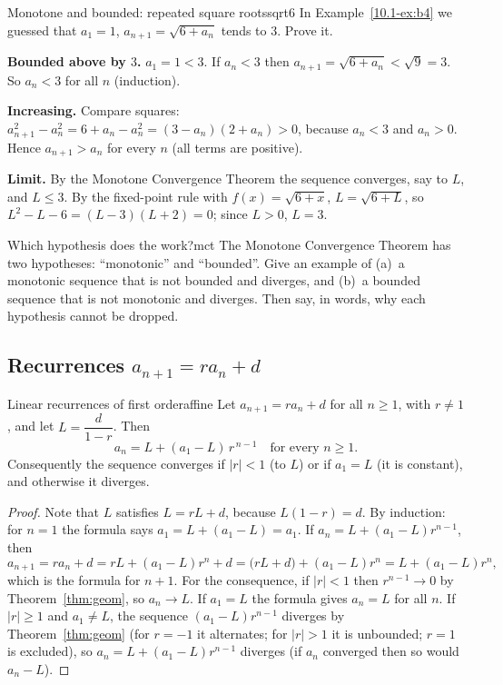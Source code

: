 \documentclass[11pt]{article}
\begin{document}
\begin{exmp}{Monotone and bounded: repeated square roots}{sqrt6}
In Example~\ref{10.1-ex:b4} we guessed that $a_1=1$, $a_{n+1}=\sqrt{6+a_n}$ tends to $3$. Prove it.

\textbf{Bounded above by $3$.} $a_1=1<3$. If $a_n<3$ then $a_{n+1}=\sqrt{6+a_n}<\sqrt{9}=3$. So $a_n<3$ for all $n$ (induction).

\textbf{Increasing.} Compare squares: $a_{n+1}^2-a_n^2=6+a_n-a_n^2=(3-a_n)(2+a_n)>0$, because $a_n<3$ and $a_n>0$. Hence $a_{n+1}>a_n$ for every $n$ (all terms are positive).

\textbf{Limit.} By the Monotone Convergence Theorem the sequence converges, say to $L$, and $L\le3$. By the fixed-point rule with $f(x)=\sqrt{6+x}$, $L=\sqrt{6+L}$, so $L^2-L-6=(L-3)(L+2)=0$; since $L>0$, $L=3$.
\end{exmp}

\begin{think}{Which hypothesis does the work?}{mct}
The Monotone Convergence Theorem has two hypotheses: ``monotonic'' and ``bounded''. Give an example of (a)~a monotonic sequence that is not bounded and diverges, and (b)~a bounded sequence that is not monotonic and diverges. Then say, in words, why each hypothesis cannot be dropped.
\end{think}

\subsection*{Recurrences $a_{n+1}=ra_n+d$}

\begin{thm}{Linear recurrences of first order}{affine}
Let $a_{n+1}=ra_n+d$ for all $n\ge1$, with $r\ne1$, and let $L=\dfrac d{1-r}$. Then
\[
a_n=L+(a_1-L)\,r^{\,n-1}\quad\text{for every } n\ge1 .
\]
Consequently the sequence converges if $|r|<1$ (to $L$) or if $a_1=L$ (it is constant), and otherwise it diverges.
\end{thm}
\begin{proof}
Note that $L$ satisfies $L=rL+d$, because $L(1-r)=d$. By induction: for $n=1$ the formula says $a_1=L+(a_1-L)=a_1$. If $a_n=L+(a_1-L)r^{n-1}$, then
\[
a_{n+1}=ra_n+d=rL+(a_1-L)r^{n}+d=\big(rL+d\big)+(a_1-L)r^n=L+(a_1-L)r^{n},
\]
which is the formula for $n+1$. For the consequence, if $|r|<1$ then $r^{n-1}\to0$ by Theorem~\ref{thm:geom}, so $a_n\to L$. If $a_1=L$ the formula gives $a_n=L$ for all $n$. If $|r|\ge1$ and $a_1\ne L$, the sequence $(a_1-L)r^{n-1}$ diverges by Theorem~\ref{thm:geom} (for $r=-1$ it alternates; for $|r|>1$ it is unbounded; $r=1$ is excluded), so $a_n=L+(a_1-L)r^{n-1}$ diverges (if $a_n$ converged then so would $a_n-L$).
\end{proof}
\end{document}
